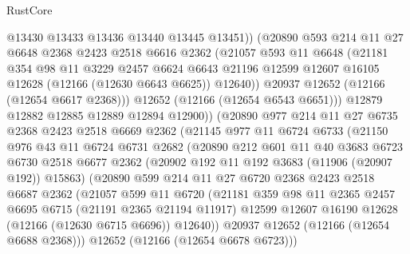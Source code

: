 \begin{lexlean}{RustCore}
\begin{coremodule}
                @13430
                @13433
                @13436
                @13440
                @13445
                @13451))
            (@20890
              @593
              @214
              @11
              @27
              @6648
              @2368
              @2423
              @2518
              @6616
              @2362
              (@21057
                @593
                @11
                @6648
                (@21181
                  @354
                  @98
                  @11
                  @3229
                  @2457
                  @6624
                  @6643
                  @21196
                  @12599
                  @12607
                  @16105
                  @12628
                  (@12166 (@12630 @6643 @6625))
                  @12640))
              @20937
              @12652
              (@12166 (@12654 @6617 @2368)))
            @12652
            (@12166 (@12654 @6543 @6651)))
          @12879
          @12882
          @12885
          @12889
          @12894
          @12900))
      (@20890
        @977
        @214
        @11
        @27
        @6735
        @2368
        @2423
        @2518
        @6669
        @2362
        (@21145
          @977
          @11
          @6724
          @6733
          (@21150
            @976
            @43
            @11
            @6724
            @6731
            @2682
            (@20890
              @212
              @601
              @11
              @40
              @3683
              @6723
              @6730
              @2518
              @6677
              @2362
              (@20902 @192 @11 @192 @3683 (@11906 (@20907 @192)) @15863)
              (@20890
                @599
                @214
                @11
                @27
                @6720
                @2368
                @2423
                @2518
                @6687
                @2362
                (@21057
                  @599
                  @11
                  @6720
                  (@21181
                    @359
                    @98
                    @11
                    @2365
                    @2457
                    @6695
                    @6715
                    (@21191 @2365 @21194 @11917)
                    @12599
                    @12607
                    @16190
                    @12628
                    (@12166 (@12630 @6715 @6696))
                    @12640))
                @20937
                @12652
                (@12166 (@12654 @6688 @2368)))
              @12652
              (@12166 (@12654 @6678 @6723)))

\end{coremodule}
\end{lexlean}
